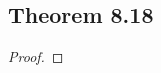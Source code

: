 \documentclass[../../main.tex]{subfiles}
\begin{document}
\subsection{Theorem 8.18}
\begin{wts}

\end{wts}
\begin{proof}

\end{proof}
\end{document}
